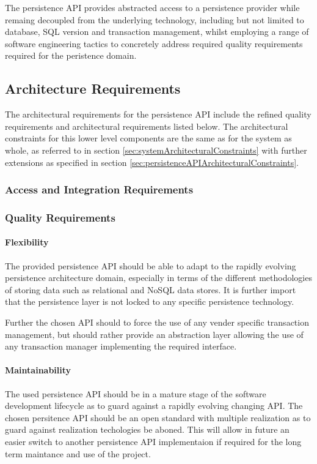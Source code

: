 The persistence API provides abstracted access to a persistence provider while
remaing decoupled from the underlying technology, including but not limited to
database, SQL version and transaction management, whilst employing a range of
software engineering tactics to concretely address required quality
requirements required for the peristence domain.

\subsection{Architecture Requirements}
The architectural requirements for the persistence API include the refined
quality requirements and architectural requirements listed below. The
architectural constraints for this lower level components are the same as for
the system as whole, as referred to in
section \ref{sec:systemArchitecturalConstraints} with further extensions as
specified in section \ref{sec:persistenceAPIArchitecturalConstraints}.

\subsubsection{Access and Integration Requirements}
\subsubsection{Quality Requirements}
\paragraph{Flexibility}
The provided persistence API should be able to adapt to the rapidly evolving
persistence architecture domain, especially in terms of the different
methodologies of storing data such as relational and NoSQL data stores. It is
further import that the persistence layer is not locked to any specific
persistence technology.

Further the chosen API should to force the use of any vender specific
transaction management, but should rather provide an abstraction layer allowing
the use of any transaction manager implementing the required interface.

\paragraph{Maintainability}
\label{sec:persistenceAPIMaintainability}
The used persistence API should be in a mature stage of the software development
lifecycle as to guard against a rapidly evolving changing API. The chosen
persitence API should be an open standard with multiple realization as to guard
against realization techologies be aboned. This will allow in future an easier
switch to another persistence API implementaion if required for the long term
maintance and use of the project.

